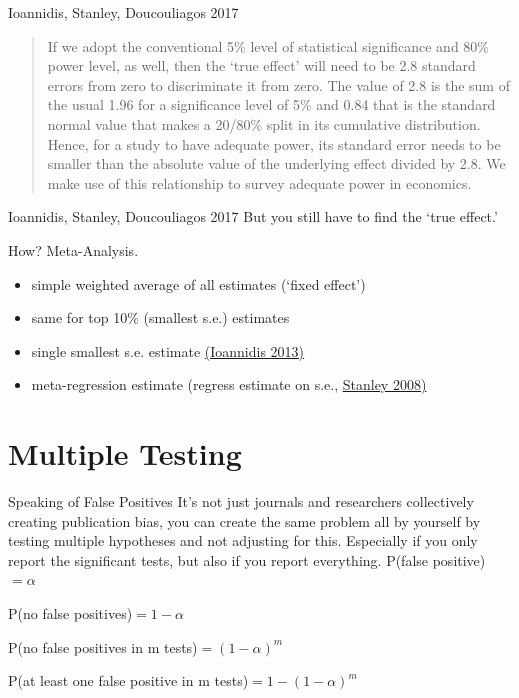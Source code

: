 \documentclass{beamer}
\begin{document}
\begin{frame}{Ioannidis, Stanley, Doucouliagos 2017}
\begin{quote}If we adopt the conventional 5\% level of statistical significance and 80\% power
level, as well, then the `true effect' will need to be 2.8 standard errors from zero to
discriminate it from zero. The value of 2.8 is the sum of the usual 1.96 for a
significance level of 5\% and 0.84 that is the standard normal value that makes a 20/80\% split in its cumulative distribution. Hence, for a study to have adequate power, its
standard error needs to be smaller than the absolute value of the underlying effect
divided by 2.8. We make use of this relationship to survey adequate power in
economics.
\end{quote}
\end{frame}

\begin{frame}{Ioannidis, Stanley, Doucouliagos 2017}
But you still have to find the `true effect.' 

How? Meta-Analysis.
\begin{itemize}
\item simple weighted average of all estimates (`fixed effect')
\item same for top 10\% (smallest s.e.) estimates
\item single smallest s.e. estimate \href{https://www.sciencedirect.com/science/article/pii/S0022249613000278}{(Ioannidis 2013)}
\item meta-regression estimate (regress estimate on s.e., \href{http://onlinelibrary.wiley.com/doi/10.1111/j.1468-0084.2007.00487.x/full}{Stanley 2008)}
\end{itemize}
\end{frame}

\section{Multiple Testing}
\begin{frame}{Speaking of False Positives}
It's not just journals and researchers collectively creating publication bias, you can create the same problem all by yourself by testing multiple hypotheses and not adjusting for this. Especially if you only report the significant tests, but also if you report everything.
\vskip0.25in
P(false positive)$=\alpha$

P(no false positives)$=1-\alpha$

P(no false positives in m tests)$=(1-\alpha)^m$

P(at least one false positive in m tests)$=1-(1-\alpha)^m$
\end{frame}
\end{document}
